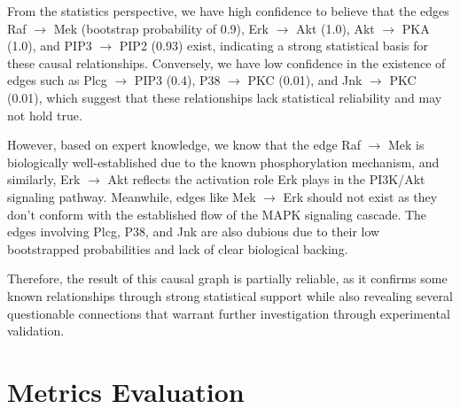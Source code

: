 \documentclass{article}
\begin{document}
From the statistics perspective, we have high confidence to believe that the edges Raf $\rightarrow$ Mek (bootstrap probability of 0.9), Erk $\rightarrow$ Akt (1.0), Akt $\rightarrow$ PKA (1.0), and PIP3 $\rightarrow$ PIP2 (0.93) exist, indicating a strong statistical basis for these causal relationships. Conversely, we have low confidence in the existence of edges such as Plcg $\rightarrow$ PIP3 (0.4), P38 $\rightarrow$ PKC (0.01), and Jnk $\rightarrow$ PKC (0.01), which suggest that these relationships lack statistical reliability and may not hold true. 

However, based on expert knowledge, we know that the edge Raf $\rightarrow$ Mek is biologically well-established due to the known phosphorylation mechanism, and similarly, Erk $\rightarrow$ Akt reflects the activation role Erk plays in the PI3K/Akt signaling pathway. Meanwhile, edges like Mek $\rightarrow$ Erk should not exist as they don't conform with the established flow of the MAPK signaling cascade. The edges involving Plcg, P38, and Jnk are also dubious due to their low bootstrapped probabilities and lack of clear biological backing.

Therefore, the result of this causal graph is partially reliable, as it confirms some known relationships through strong statistical support while also revealing several questionable connections that warrant further investigation through experimental validation.

\section{Metrics Evaluation}
\end{document}
